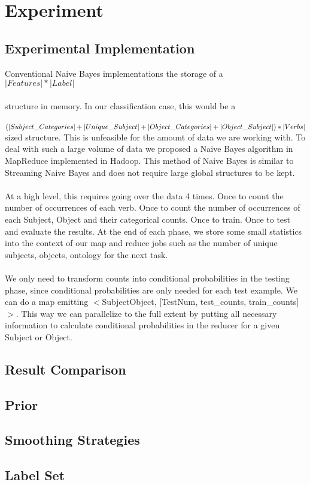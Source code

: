 \section{Experiment}

\subsection{Experimental Implementation}

Conventional Naive Bayes implementations the storage of a \\
$|Features| * |Label|$ \\
\\
structure in memory. In our classification case, this would be a \\
\\
$(|Subject\_Categories|+|Unique\_Subject|\\+|Object\_Categories|+|Object\_Subject|) * |Verbs|$ \\

sized structure. This is unfeasible for the amount of data we are working with. To deal with such a large volume of data we proposed a Naive Bayes algorithm in MapReduce implemented in Hadoop. This method of Naive Bayes is similar to Streaming Naive Bayes and does not require large global structures to be kept.\\
\\
At a high level, this requires going over the data 4 times. Once to count the number of occurrences of each verb. Once to count the number of occurrences of each Subject, Object and their categorical counts. Once to train. Once to test and evaluate the results. At the end of each phase, we store some small statistics into the context of our map and reduce jobs such as the number of unique subjects, objects, ontology for the next task.\\
\\
We only need to transform counts into conditional probabilities in the testing phase, since conditional probabilities are only needed for each test example. We can do a map emitting $<$Subject\/Object, [TestNum, test\_counts, train\_counts]$>$. This way we can parallelize to the full extent by putting all necessary information to calculate conditional probabilities in the reducer for a given Subject or Object. 

\subsection{Result Comparison}

\subsection{Prior}

\subsection{Smoothing Strategies}

\subsection{Label Set}


